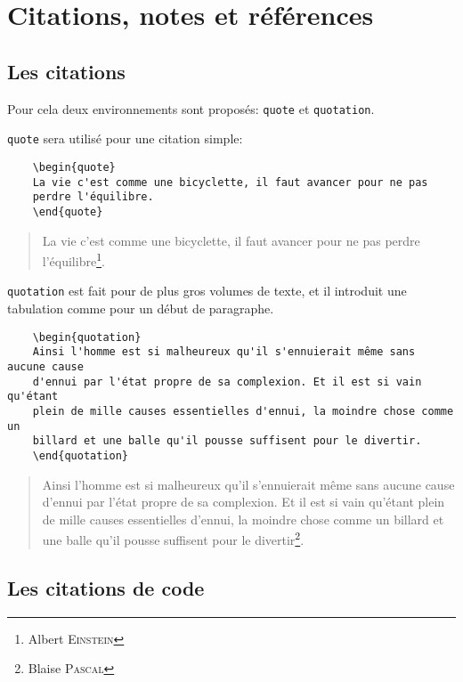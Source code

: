 
\chapter{Citations, notes et références}
\section{Les citations}
Pour cela deux environnements sont proposés: \texttt{quote} et \texttt{quotation}.
\medskip

\texttt{quote} sera utilisé pour une citation simple:
\begin{verbatim}
    \begin{quote}
    La vie c'est comme une bicyclette, il faut avancer pour ne pas 
    perdre l'équilibre.
    \end{quote}
\end{verbatim}
\medskip

\begin{quote}
La vie c'est comme une bicyclette, il faut avancer pour ne pas perdre l'équilibre\footnote{Albert \textsc{Einstein}}.
\end{quote}
\medskip

\texttt{quotation} est fait pour de plus gros volumes de texte, et il introduit une tabulation comme pour un début de paragraphe.
\medskip
\begin{verbatim}
    \begin{quotation}
    Ainsi l'homme est si malheureux qu'il s'ennuierait même sans aucune cause 
    d'ennui par l'état propre de sa complexion. Et il est si vain qu'étant 
    plein de mille causes essentielles d'ennui, la moindre chose comme un 
    billard et une balle qu'il pousse suffisent pour le divertir.
    \end{quotation}
\end{verbatim}
\medskip

\begin{quotation}
Ainsi l'homme est si malheureux qu'il s'ennuierait même sans aucune cause d'ennui par l'état propre de sa complexion. Et il est si vain qu'étant plein de mille causes essentielles d'ennui, la moindre chose comme un billard et une balle qu'il pousse suffisent pour le divertir\footnote{Blaise \textsc{Pascal}}.
\end{quotation}
\medskip

\section{Les citations de code}
